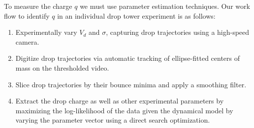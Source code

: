 \documentclass[12pt,a4paper,oneside]{book}
\begin{document}
To measure the charge $q$ we must use parameter estimation techniques. Our work flow to identify $q$ in an individual drop tower experiment is as follows:
\begin{enumerate}
\item Experimentally vary $V_d$ and $\sigma$, capturing drop trajectories using a high-speed camera.
\item Digitize drop trajectories via automatic tracking of ellipse-fitted centers of mass on the thresholded video.
\item Slice drop trajectories by their bounce minima and apply a smoothing filter.
\item Extract the drop charge as well as other experimental parameters by maximizing the log-likelihood of the data given the dynamical model by varying the parameter vector using a direct search optimization. 
\end{enumerate}
\end{document}
